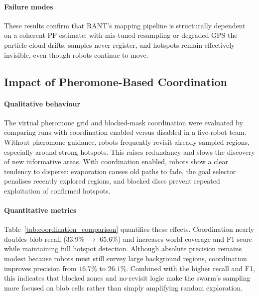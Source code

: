 \documentclass[lettersize,journal]{IEEEtran}
\begin{document}
\paragraph{Failure modes}
These results confirm that RANT’s mapping pipeline is structurally dependent on
a coherent PF estimate: with mis-tuned resampling or degraded GPS the particle
cloud drifts, samples never register, and hotspots remain effectively invisible,
even though robots continue to move.

\subsection{Impact of Pheromone-Based Coordination}

\paragraph{Qualitative behaviour}
The virtual pheromone grid and blocked-mask coordination were evaluated by
comparing runs with coordination enabled versus disabled in a five-robot team.
Without pheromone guidance, robots frequently revisit already sampled regions,
especially around strong hotspots. This raises redundancy and slows the
discovery of new informative areas. With coordination enabled, robots show a
clear tendency to disperse: evaporation causes old paths to fade, the goal
selector penalises recently explored regions, and blocked discs prevent
repeated exploitation of confirmed hotspots.

\paragraph{Quantitative metrics}
Table~\ref{tab:coordination_comparison} quantifies these effects. Coordination
nearly doubles blob recall (33.9\% $\rightarrow$ 65.6\%) and increases world
coverage and F1 score while maintaining full hotspot detection. Although
absolute precision remains modest because robots must still survey large
background regions, coordination improves precision from $16.7\%$ to $26.1\%$.
Combined with the higher recall and F1, this indicates that blocked zones and
no-revisit logic make the swarm’s sampling more focused on blob cells rather
than simply amplifying random exploration.
\end{document}
